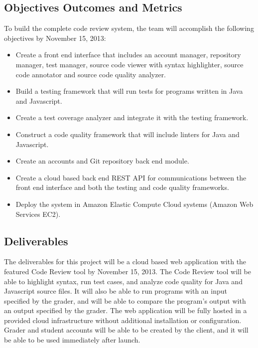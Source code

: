 
\subsection{Objectives Outcomes and Metrics}
To build the complete code review system, the team will accomplish the following
objectives by November 15, 2013:

\begin{itemize}
\item Create a front end interface that includes an account
manager, repository manager, test manager, source code viewer with syntax
highlighter, source code annotator and source code quality analyzer.

\item Build a testing framework that will run tests for programs written in 
Java and Javascript.

\item Create a test coverage analyzer and integrate it with the testing
framework.

\item Construct a code quality framework that will include linters for Java
and Javascript.

\item Create an accounts and Git repository back end module.

\item Create a cloud based back end REST API for communications between the
front end interface and both the testing and code quality frameworks.

\item Deploy the system in Amazon Elastic Compute Cloud systems (Amazon Web
Services EC2).

\end{itemize}
\subsection{Deliverables}

The deliverables for this project will be a cloud based web application with the
featured Code Review tool by November 15, 2013. The Code Review tool will be
able to highlight syntax, run test cases, and analyze code quality for Java
and Javascript source files. It will also be able to run programs with an input
specified by the grader, and will be able to compare the program's output with
an output specified by the grader. The web application will be fully hosted in a
provided cloud infrastructure without additional installation or configuration.
Grader and student accounts will be able to be created by the client, and it
will be able to be used immediately after launch.

